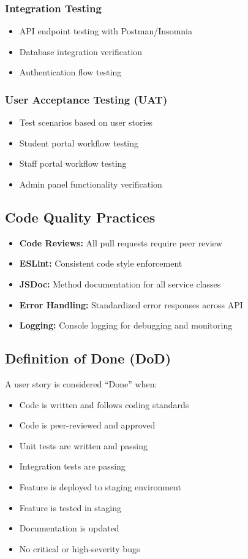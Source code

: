\documentclass[12pt,a4paper]{article}
\begin{document}
\subsubsection{Integration Testing}
\begin{itemize}[noitemsep]
    \item API endpoint testing with Postman/Insomnia
    \item Database integration verification
    \item Authentication flow testing
\end{itemize}

\subsubsection{User Acceptance Testing (UAT)}
\begin{itemize}[noitemsep]
    \item Test scenarios based on user stories
    \item Student portal workflow testing
    \item Staff portal workflow testing
    \item Admin panel functionality verification
\end{itemize}

\subsection{Code Quality Practices}

\begin{itemize}[noitemsep]
    \item \textbf{Code Reviews:} All pull requests require peer review
    \item \textbf{ESLint:} Consistent code style enforcement
    \item \textbf{JSDoc:} Method documentation for all service classes
    \item \textbf{Error Handling:} Standardized error responses across API
    \item \textbf{Logging:} Console logging for debugging and monitoring
\end{itemize}

\subsection{Definition of Done (DoD)}

A user story is considered ``Done'' when:
\begin{itemize}[noitemsep]
    \item Code is written and follows coding standards
    \item Code is peer-reviewed and approved
    \item Unit tests are written and passing
    \item Integration tests are passing
    \item Feature is deployed to staging environment
    \item Feature is tested in staging
    \item Documentation is updated
    \item No critical or high-severity bugs
\end{itemize}
\end{document}
